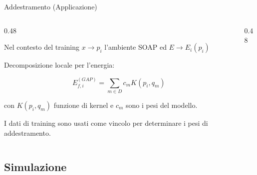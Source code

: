 \begin{frame}{Addestramento (Applicazione)}
	\begin{columns}[c]
		\begin{column}{0.48\textwidth}
			
			Nel contesto del training $x \rightarrow p_i$ l'ambiente SOAP ed $E \rightarrow E_i(p_i)$
			
			\vspace{5pt}
			Decomposizione locale per l'energia:
			
			\begin{equation}
				E_{f,i}^{(GAP)} = \sum_{m \in D} c_m K(p_i, q_m)
			\end{equation}
			
			con $K(p_i, q_m)$ funzione di kernel e $c_m$ sono i pesi del modello.
			
			I dati di training sono usati come vincolo per determinare i pesi di addestramento.
			
		\end{column}
		
		\begin{column}{0.48\textwidth}
			
		\end{column}
	\end{columns}
\end{frame}









\subsection{Simulazione} %


